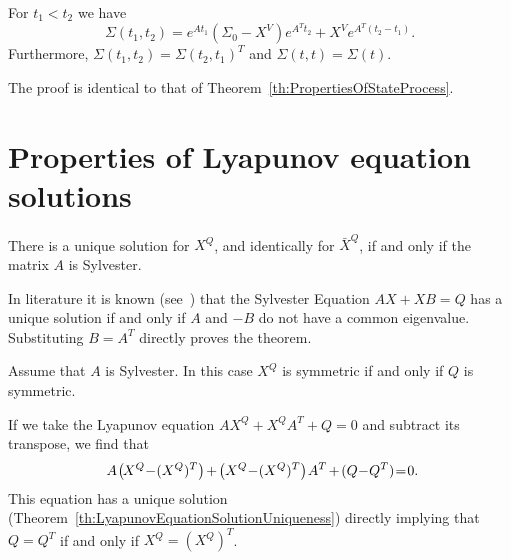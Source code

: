\documentclass[twocolumn]{autart}
\begin{document}
\begin{thm}\label{th:MultipleTimeStateProcess}
For $t_1 < t_2$ we have
\begin{equation}
\Sigma(t_1,t_2) = e^{A t_1} (\Sigma_0 - X^V) e^{A^T t_2} + X^V e^{A^T (t_2 - t_1)}.
\end{equation}
Furthermore, $\Sigma(t_1,t_2) = \Sigma(t_2,t_1)^T$ and $\Sigma(t,t) = \Sigma(t)$.
\end{thm}
\begin{pf}
The proof is identical to that of Theorem~\ref{th:PropertiesOfStateProcess}.
\end{pf}

\section{Properties of Lyapunov equation solutions} \label{s:LyapunovTheorems}

\begin{thm}\label{th:LyapunovEquationSolutionUniqueness}
There is a unique solution for $X^Q$, and identically for $\bar{X}^Q$, if and only if the matrix $A$ is Sylvester.
\end{thm}
\begin{pf}
In literature it is known (see~\cite{SylvesterEquation}) that the Sylvester Equation $AX + XB = Q$ has a unique solution if and only if $A$ and $-B$ do not have a common eigenvalue. Substituting $B = A^T$ directly proves the theorem.
\end{pf}

\begin{thm}\label{th:SymmetricLyapunovSolution}
Assume that $A$ is Sylvester. In this case $X^Q$ is symmetric if and only if $Q$ is symmetric.
\end{thm}
\begin{pf}
If we take the Lyapunov equation $A X^Q + X^Q A^T + Q = 0$ and subtract its transpose, we find that
\begin{equation}
\hspace{-4pt} A \hspace{-1pt}\left(\hspace{-1pt}X^Q \hspace{-2pt}-\hspace{-2pt} (X^Q)^T\right) \hspace{-1pt}+\hspace{-1pt} \left(X^Q \hspace{-2pt}-\hspace{-2pt} (X^Q)^T\right)\hspace{-1pt} A^T \hspace{-1pt}+\hspace{-1pt} (Q \hspace{-2pt}-\hspace{-2pt} Q^T) \hspace{-2pt}=\hspace{-2pt} 0.\hspace{-8pt}
\end{equation}
This equation has a unique solution (Theorem~\ref{th:LyapunovEquationSolutionUniqueness}) directly implying that $Q = Q^T$ if and only if $X^Q = (X^Q)^T$.
\end{pf}
\end{document}
